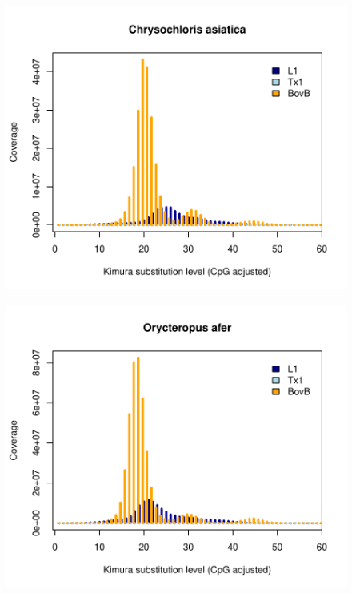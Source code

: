 \documentclass[12pt,a4paper,times]{article}
\begin{document}
\begin{figure}[H]
	\centering
	\includegraphics[scale=0.8]{suppFigures/divergencePlots/Chrysochloris_asiatica.pdf}
	\caption{\label{Chrysochloris}}
\end{figure}

\begin{figure}[H]
	\centering
	\includegraphics[scale=0.8]{suppFigures/divergencePlots/Orycteropus_afer.pdf}
	\caption{\label{Orycteropus}}
\end{figure}
\end{document}
